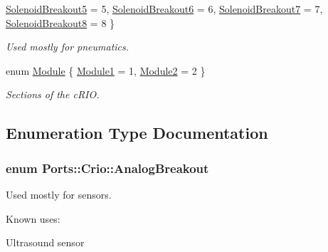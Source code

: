 \begin{DoxyCompactItemize}
\*
\hyperlink{namespace_ports_1_1_crio_a22e0c5a7a7529735b35a09e0f727cf72abb9c55cef41e872d88607d3e33be5be6}{\-Solenoid\-Breakout5} =  5, 
\hyperlink{namespace_ports_1_1_crio_a22e0c5a7a7529735b35a09e0f727cf72aa650ef5df05970dd7a36e9c3e7b5921d}{\-Solenoid\-Breakout6} =  6, 
\hyperlink{namespace_ports_1_1_crio_a22e0c5a7a7529735b35a09e0f727cf72a0fd7790f9a01880adf7186c3bede4837}{\-Solenoid\-Breakout7} =  7, 
\hyperlink{namespace_ports_1_1_crio_a22e0c5a7a7529735b35a09e0f727cf72ae1130fb78ac05430d663a48ae4eae554}{\-Solenoid\-Breakout8} =  8
 \}
\begin{DoxyCompactList}\small\item\em \-Used mostly for pneumatics. \end{DoxyCompactList}\item 
enum \hyperlink{namespace_ports_1_1_crio_aa86b9e625abfa5049c7e1570b31cc56e}{\-Module} \{ \hyperlink{namespace_ports_1_1_crio_aa86b9e625abfa5049c7e1570b31cc56eaff122a0610e9c70a88c7f7f1d67efe65}{\-Module1} =  1, 
\hyperlink{namespace_ports_1_1_crio_aa86b9e625abfa5049c7e1570b31cc56ea914ea7bcb2f017abbfb257a9a3d91766}{\-Module2} =  2
 \}
\begin{DoxyCompactList}\small\item\em \-Sections of the c\-R\-I\-O. \end{DoxyCompactList}\end{DoxyCompactItemize}


\subsection{\-Enumeration \-Type \-Documentation}
\hypertarget{namespace_ports_1_1_crio_a7559819d31079e0677b999150af1b1b1}{
\subsubsection[{\-Analog\-Breakout}]{\setlength{\rightskip}{0pt plus 5cm}enum {\bf \-Ports\-::\-Crio\-::\-Analog\-Breakout}}}\label{namespace_ports_1_1_crio_a7559819d31079e0677b999150af1b1b1}


\-Used mostly for sensors. 

\-Known uses\-:
\begin{DoxyItemize}
\item \-Ultrasound sensor
\end{DoxyItemize}

